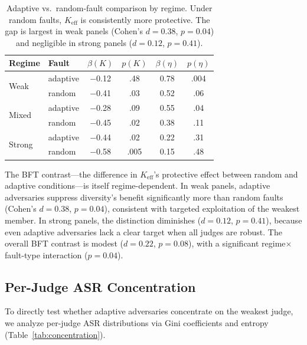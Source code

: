 \documentclass[11pt]{article}
\begin{document}
\begin{table}[t]
\centering
\small
\begin{tabular}{llcccc}
\toprule
\textbf{Regime} & \textbf{Fault} & $\beta(K)$ & $p(K)$ & $\beta(\eta)$ & $p(\eta)$ \\
\midrule
\multirow{2}{*}{Weak} & adaptive & $-$0.12 & .48 & 0.78 & .004 \\
 & random & $-$0.41 & .03 & 0.52 & .06 \\
\midrule
\multirow{2}{*}{Mixed} & adaptive & $-$0.28 & .09 & 0.55 & .04 \\
 & random & $-$0.45 & .02 & 0.38 & .11 \\
\midrule
\multirow{2}{*}{Strong} & adaptive & $-$0.44 & .02 & 0.22 & .31 \\
 & random & $-$0.58 & .005 & 0.15 & .48 \\
\bottomrule
\end{tabular}
\caption{Adaptive vs.\ random-fault comparison by regime. Under random faults, $K_{\text{eff}}$ is consistently more protective. The gap is largest in weak panels (Cohen's $d = 0.38$, $p = 0.04$) and negligible in strong panels ($d = 0.12$, $p = 0.41$).}
\label{tab:bft_contrast}
\end{table}

The BFT contrast---the difference in $K_{\text{eff}}$'s protective effect between random and adaptive conditions---is itself regime-dependent.
In weak panels, adaptive adversaries suppress diversity's benefit significantly more than random faults (Cohen's $d = 0.38$, $p = 0.04$), consistent with targeted exploitation of the weakest member.
In strong panels, the distinction diminishes ($d = 0.12$, $p = 0.41$), because even adaptive adversaries lack a clear target when all judges are robust.
The overall BFT contrast is modest ($d = 0.22$, $p = 0.08$), with a significant regime$\times$fault-type interaction ($p = 0.04$).

\subsection{Per-Judge ASR Concentration}
\label{sec:concentration}

To directly test whether adaptive adversaries concentrate on the weakest judge, we analyze per-judge ASR distributions via Gini coefficients and entropy (Table~\ref{tab:concentration}).
\end{document}
